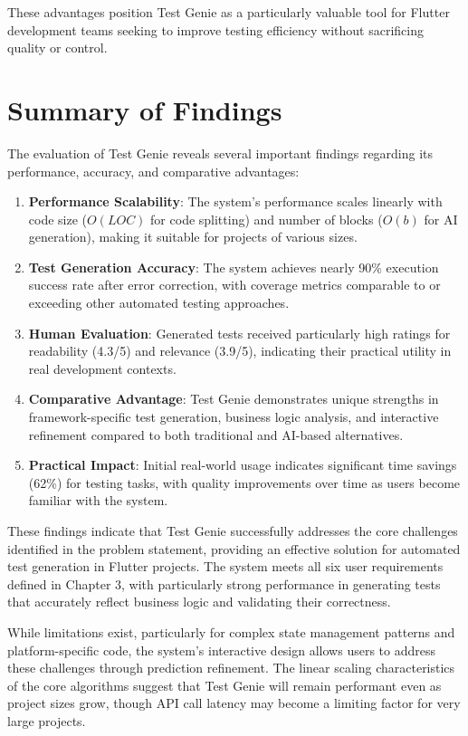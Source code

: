 These advantages position Test Genie as a particularly valuable tool for Flutter development teams seeking to improve testing efficiency without sacrificing quality or control.

\section{Summary of Findings}

The evaluation of Test Genie reveals several important findings regarding its performance, accuracy, and comparative advantages:

\begin{enumerate}
    \item \textbf{Performance Scalability}: The system's performance scales linearly with code size ($O(LOC)$ for code splitting) and number of blocks ($O(b)$ for AI generation), making it suitable for projects of various sizes.
    
    \item \textbf{Test Generation Accuracy}: The system achieves nearly 90\% execution success rate after error correction, with coverage metrics comparable to or exceeding other automated testing approaches.
    
    \item \textbf{Human Evaluation}: Generated tests received particularly high ratings for readability (4.3/5) and relevance (3.9/5), indicating their practical utility in real development contexts.
    
    \item \textbf{Comparative Advantage}: Test Genie demonstrates unique strengths in framework-specific test generation, business logic analysis, and interactive refinement compared to both traditional and AI-based alternatives.
    
    \item \textbf{Practical Impact}: Initial real-world usage indicates significant time savings (62\%) for testing tasks, with quality improvements over time as users become familiar with the system.
\end{enumerate}

These findings indicate that Test Genie successfully addresses the core challenges identified in the problem statement, providing an effective solution for automated test generation in Flutter projects. The system meets all six user requirements defined in Chapter 3, with particularly strong performance in generating tests that accurately reflect business logic and validating their correctness.

While limitations exist, particularly for complex state management patterns and platform-specific code, the system's interactive design allows users to address these challenges through prediction refinement. The linear scaling characteristics of the core algorithms suggest that Test Genie will remain performant even as project sizes grow, though API call latency may become a limiting factor for very large projects.